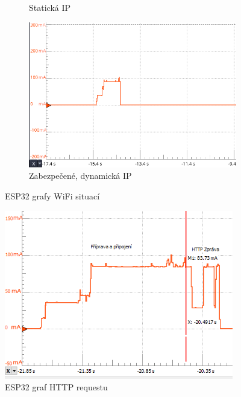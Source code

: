 \documentclass[a4paper, 12pt]{report}
\begin{document}
\begin{figure}[!ht]
\begin{subfigure}[b]{0.55\linewidth}
            \caption{Statická IP}
        \end{subfigure}
        \begin{subfigure}[b]{0.55\linewidth}
            \includegraphics[width=\linewidth]{images/ESP32_network_static_security}
            \caption{Zabezpečené, dynamická IP}
        \end{subfigure}
        \caption{ESP32 grafy WiFi situací}
        \label{fig:esp32_network}
    \end{figure}
    \begin{figure}[h!]
        \centering
        \includegraphics[width=10cm]{images/ESP32_http}
        \caption{ESP32 graf HTTP requestu}
        \label{fig:esp32_http}
    \end{figure}
\end{document}
